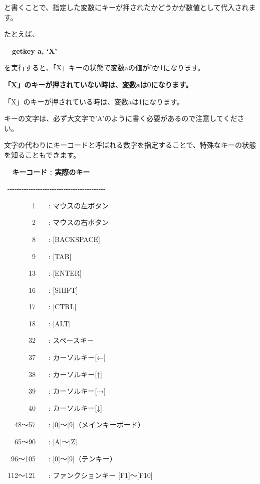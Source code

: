 \documentclass[a4paper,12pt]{jarticle}
\begin{document}
\bigskip

と書くことで、指定した変数にキーが押されたかどうかが数値として代入されます。

たとえば、


\bigskip

{\bfseries
\ \ getkey a, ‘X’}


\bigskip

を実行すると、「X」キーの状態で変数aの値が0か1になります。

{\bfseries
「X」のキーが押されていない時は、変数aは0になります。

「X」のキーが押されている時は、変数aは1になります。}

\bigskip

キーの文字は、必ず大文字で’A’のように書く必要があるので注意してください。

文字の代わりにキーコードと呼ばれる数字を指定することで、特殊なキーの状態を知ることもできます。


\bigskip

{\bfseries
\ \ キーコード : 実際のキー

\ {}-{}-{}-{}-{}-{}-{}-{}-{}-{}-{}-{}-{}-{}-{}-{}-{}-{}-{}-{}-{}-{}-{}-{}-{}-{}-{}-{}-{}-{}-{}-{}-{}-{}-{}-{}-{}-{}-{}-{}-{}-{}-

\ \ \ \ \ \ \ \ 1 \ \ \ : マウスの左ボタン

\ \ \ \ \ \ \ \ 2 \ \ \ : マウスの右ボタン

\ \ \ \ \ \ \ \ 8 \ \ \ : [BACKSPACE]

\ \ \ \ \ \ \ \ 9 \ \ \ : [TAB]

\ \ \ \ \ \ \ 13 \ \ \ : [ENTER]

\ \ \ \ \ \ \ 16 \ \ \ : [SHIFT]

\ \ \ \ \ \ \ 17 \ \ \ : [CTRL]

\ \ \ \ \ \ \ 18 \ \ \ : [ALT]

\ \ \ \ \ \ \ 32 \ \ \ : スペースキー

\ \ \ \ \ \ \ 37 \ \ \ : カーソルキー[←]

\ \ \ \ \ \ \ 38 \ \ \ : カーソルキー[↑]

\ \ \ \ \ \ \ 39 \ \ \ : カーソルキー[→]

\ \ \ \ \ \ \ 40 \ \ \ : カーソルキー[↓]

\ \ \ 48〜57 \ \ \ : [0]〜[9]（メインキーボード）

\ \ \ 65〜90 \ \ \ : [A]〜[Z]

\ \ 96〜105 \ \ \ : [0]〜[9]（テンキー）

\ 112〜121 \ \ \ : ファンクションキー [F1]〜[F10]}
\end{document}
